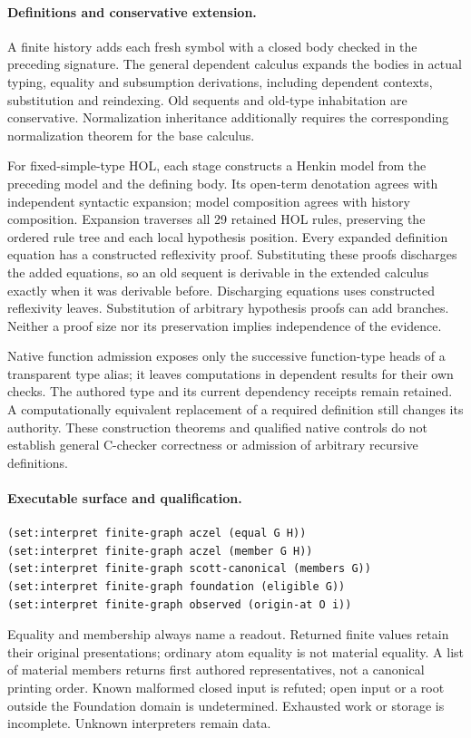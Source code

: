 \documentclass[11pt]{article}
\begin{document}
\paragraph{Definitions and conservative extension.}
A finite history adds each fresh symbol with a closed body checked in the
preceding signature. The general dependent calculus expands the bodies in
actual typing, equality and subsumption derivations, including dependent
contexts, substitution and reindexing. Old sequents and old-type inhabitation
are conservative. Normalization inheritance additionally requires the
corresponding normalization theorem for the base calculus.

For fixed-simple-type HOL, each stage constructs a Henkin model from the
preceding model and the defining body. Its open-term denotation agrees with
independent syntactic expansion; model composition agrees with history
composition. Expansion traverses all 29 retained HOL rules, preserving the
ordered rule tree and each local hypothesis position. Every expanded
definition equation has a constructed reflexivity proof. Substituting these
proofs discharges the added equations, so an old sequent is derivable in the
extended calculus exactly when it was derivable before. Discharging equations
uses constructed reflexivity leaves. Substitution of arbitrary hypothesis
proofs can add branches. Neither a proof size nor its preservation implies
independence of the evidence.

Native function admission exposes only the successive function-type heads of
a transparent type alias; it leaves computations in dependent results for
their own checks. The authored type and its current dependency receipts remain
retained. A computationally equivalent replacement of a required definition
still changes its authority. These construction theorems and qualified native
controls do not establish general C-checker correctness or admission of
arbitrary recursive definitions.

\paragraph{Executable surface and qualification.}
\begin{verbatim}
(set:interpret finite-graph aczel (equal G H))
(set:interpret finite-graph aczel (member G H))
(set:interpret finite-graph scott-canonical (members G))
(set:interpret finite-graph foundation (eligible G))
(set:interpret finite-graph observed (origin-at O i))
\end{verbatim}
Equality and membership always name a readout. Returned finite values retain
their original presentations; ordinary atom equality is not material
equality. A list of material members returns first authored representatives,
not a canonical printing order. Known malformed closed input is refuted;
open input or a root outside the Foundation domain is undetermined.
Exhausted work or storage is incomplete. Unknown interpreters remain data.
\end{document}
